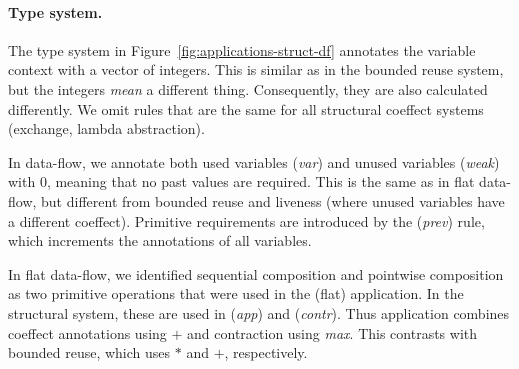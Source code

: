 \paragraph{Type system.}
The type system in Figure~\ref{fig:applications-struct-df} annotates the variable context with a
vector of integers. This is similar as in the bounded reuse system, but the integers \emph{mean} a
different thing. Consequently, they are also calculated differently. We omit rules that are the
same for all structural coeffect systems (exchange, lambda abstraction).

In data-flow, we annotate both used variables (\emph{var}) and unused variables (\emph{weak}) with
$0$, meaning that no past values are required. This is the same as in flat data-flow, but different
from bounded reuse and liveness (where unused variables have a different coeffect). Primitive
requirements are introduced by the (\emph{prev}) rule, which increments the annotations of
all variables.

In flat data-flow, we identified sequential composition and pointwise composition as two primitive
operations that were used in the (flat) application. In the structural system, these are used in
(\emph{app}) and (\emph{contr}). Thus application combines coeffect annotations using $+$ and
contraction using \emph{max}. This contrasts with bounded reuse, which uses $\ast$ and $+$,
respectively.

